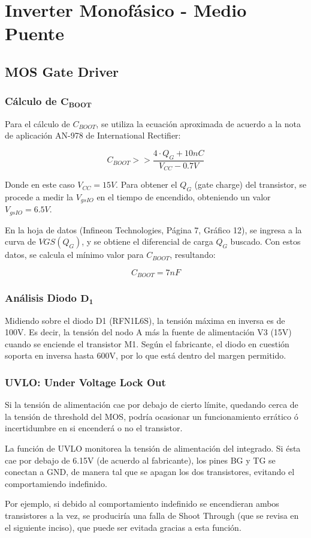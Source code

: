 \documentclass[e4_tp3_main.tex]{subfiles}
\begin{document}

\section{Inverter Monofásico - Medio Puente}

\subsection{MOS Gate Driver}

\subsubsection{Cálculo de $\mathbf{C_{BOOT}}$}

Para el cálculo de $C_{BOOT}$, se utiliza la ecuación aproximada de acuerdo a la nota de aplicación AN-978 de International Rectifier:

\[
C_{BOOT} >> \frac{4 \cdot Q_G + 10nC}{V_{CC} - 0.7V}
\]

Donde en este caso $V_{CC} = 15V$. Para obtener el $Q_G$ (gate charge) del transistor, se procede a medir la $V_{gsIO}$ en el tiempo de encendido, obteniendo un valor $V_{gsIO} = 6.5V$.\par
En la hoja de datos (Infineon Technologies, Página 7, Gráfico 12), se ingresa a la curva de $V{GS}(Q_G)$, y se obtiene el diferencial de carga $Q_G$ buscado. Con estos datos, se calcula el mínimo valor para $C_{BOOT}$, resultando:

\[
C_{BOOT} = 7nF
\]
\subsubsection{Análisis Diodo $\mathbf{D_1}$}

Midiendo sobre el diodo D1 (RFN1L6S), la tensión máxima en inversa es de 100V. Es decir, la tensión del nodo A más la fuente de alimentación V3 (15V) cuando se enciende el transistor M1. Según el fabricante, el diodo en cuestión soporta en inversa hasta 600V, por lo que está dentro del margen permitido.

\subsubsection{UVLO: Under Voltage Lock Out}

Si la tensión de alimentación cae por debajo de cierto límite, quedando cerca de la tensión de threshold del MOS, podría ocasionar un funcionamiento errático ó incertidumbre en si encenderá o no el transistor.\par
La función de UVLO monitorea la tensión de alimentación del integrado. Si ésta cae por debajo de 6.15V (de acuerdo al fabricante), los pines BG y TG se conectan a GND, de manera tal que se apagan los dos transistores, evitando el comportamiendo indefinido.\par
Por ejemplo, si debido al comportamiento indefinido se encendieran ambos transistores a la vez, se produciría una falla de Shoot Through (que se revisa en el siguiente inciso), que puede ser evitada gracias a esta función.
\end{document}
